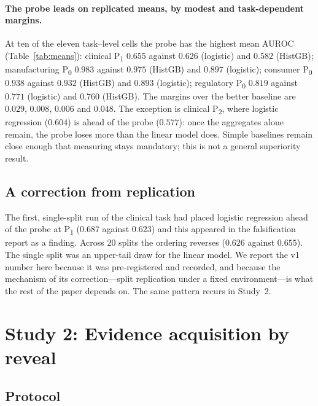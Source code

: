 \documentclass[11pt]{article}
\newcommand{\pz}{P\textsubscript{0}}
\newcommand{\po}{P\textsubscript{1}}
\newcommand{\pt}{P\textsubscript{2}}
\begin{document}
\paragraph{The probe leads on replicated means, by modest and task-dependent margins.} At ten of the eleven task--level cells the probe has the highest mean AUROC (Table~\ref{tab:means}): clinical \po{} $0.655$ against $0.626$ (logistic) and $0.582$ (HistGB); manufacturing \pz{} $0.983$ against $0.975$ (HistGB) and $0.897$ (logistic); consumer \pz{} $0.938$ against $0.932$ (HistGB) and $0.893$ (logistic); regulatory \pz{} $0.819$ against $0.771$ (logistic) and $0.760$ (HistGB). The margins over the better baseline are $0.029$, $0.008$, $0.006$ and $0.048$. The exception is clinical \pt{}, where logistic regression ($0.604$) is ahead of the probe ($0.577$): once the aggregates alone remain, the probe loses more than the linear model does. Simple baselines remain close enough that measuring stays mandatory; this is not a general superiority result.

\subsection{A correction from replication}

The first, single-split run of the clinical task had placed logistic regression ahead of the probe at \po{} ($0.687$ against $0.623$) and this appeared in the falsification report as a finding. Across 20 splits the ordering reverses ($0.626$ against $0.655$). The single split was an upper-tail draw for the linear model. We report the v1 number here because it was pre-registered and recorded, and because the mechanism of its correction---split replication under a fixed environment---is what the rest of the paper depends on. The same pattern recurs in Study~2.

\section{Study 2: Evidence acquisition by reveal}
\label{sec:study2}

\subsection{Protocol}
\end{document}
